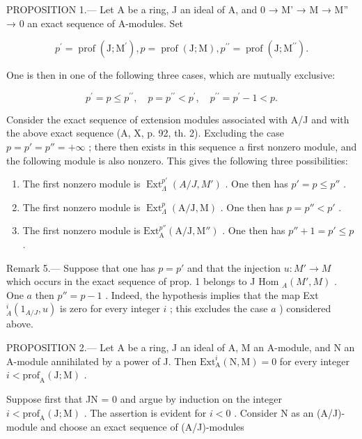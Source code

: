 PROPOSITION 1.--- Let A be a ring, J an ideal of A, and 0 → M' → M → M'' → 0 an exact sequence of A-modules. Set

\[
p ^ {\prime} = \operatorname{prof} (\mathrm{J}; \mathrm{M} ^ {\prime}), p = \operatorname{prof} (\mathrm{J}; \mathrm{M}), p ^ {\prime \prime} = \operatorname{prof} (\mathrm{J}; \mathrm{M} ^ {\prime \prime}).
\]

One is then in one of the following three cases, which are mutually exclusive:

\[
p ^ {\prime} = p \leqslant p ^ {\prime \prime}, \quad p = p ^ {\prime \prime} <   p ^ {\prime}, \quad p ^ {\prime \prime} = p ^ {\prime} - 1 <   p.
\]

Consider the exact sequence of extension modules associated with A/J and with the above exact sequence (A, X, p. 92, th. 2). Excluding the case \(p = p' = p'' = +\infty\) ; there then exists in this sequence a first nonzero module, and the following module is also nonzero. This gives the following three possibilities:

\begin{enumerate}
\def\labelenumi{\alph{enumi})}
\item
  The first nonzero module is \(\operatorname{Ext}_{\Lambda}^{p'}(A/J, M')\) . One then has \(p' = p \leqslant p''\) .
\item
  The first nonzero module is \(\operatorname{Ext}_{\Lambda}^{p}(\mathrm{A} / \mathrm{J},\mathrm{M})\) . One then has \(p = p'' < p'\) .
\item
  The first nonzero module is \(\mathrm{Ext}_{\mathrm{A}}^{p''}(\mathrm{A} / \mathrm{J},\mathrm{M}'')\) . One then has \(p'' + 1 = p' \leqslant p\) .
\end{enumerate}

Remark 5.--- Suppose that one has \(p = p'\) and that the injection \(u: M' \to M\) which occurs in the exact sequence of prop. 1 belongs to J Hom \(_A(M', M)\) . One \(a\) then \(p'' = p - 1\) . Indeed, the hypothesis implies that the map Ext \(_A^i(1_{A/J}, u)\) is zero for every integer \(i\) ; this excludes the case \(a\) ) considered above.

PROPOSITION 2.--- Let A be a ring, J an ideal of A, M an A-module, and N an A-module annihilated by a power of J. Then \(\mathrm{Ext}_{\mathrm{A}}^{i}(\mathrm{N},\mathrm{M}) = 0\) for every integer \(i < \mathrm{prof}_{\mathrm{A}}(\mathrm{J};\mathrm{M})\) .

Suppose first that JN = 0 and argue by induction on the integer \(i < \mathrm{prof}_{\mathrm{A}}(\mathrm{J};\mathrm{M})\) . The assertion is evident for \(i < 0\) . Consider N as an (A/J)-module and choose an exact sequence of (A/J)-modules

